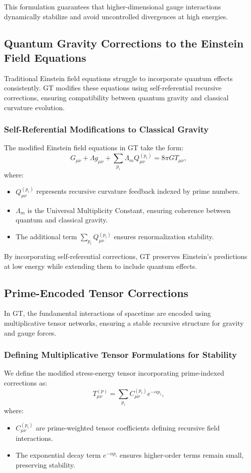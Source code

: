 \documentclass{article}
\theoremstyle{plain}
\begin{document}
This formulation guarantees that higher-dimensional gauge interactions dynamically stabilize and avoid uncontrolled divergences at high energies.

\subsection{Quantum Gravity Corrections to the Einstein Field Equations}
Traditional Einstein field equations struggle to incorporate quantum effects consistently. GT modifies these equations using self-referential recursive corrections, ensuring compatibility between quantum gravity and classical curvature evolution.

\subsubsection{Self-Referential Modifications to Classical Gravity}
The modified Einstein field equations in GT take the form:
\begin{equation}
G_{\mu\nu} + \Lambda g_{\mu\nu} + \sum_{p_i} \Lambda_m Q_{\mu\nu}^{(p_i)} = 8\pi G T_{\mu\nu},
\end{equation}
where:
\begin{itemize}
\item $Q_{\mu\nu}^{(p_i)}$ represents recursive curvature feedback indexed by prime numbers.
\item $\Lambda_m$ is the Universal Multiplicity Constant, ensuring coherence between quantum and classical gravity.
\item The additional term $\sum_{p_i} Q_{\mu\nu}^{(p_i)}$ ensures renormalization stability.
\end{itemize}

By incorporating self-referential corrections, GT preserves Einstein’s predictions at low energy while extending them to include quantum effects.

\subsection{Prime-Encoded Tensor Corrections}
In GT, the fundamental interactions of spacetime are encoded using multiplicative tensor networks, ensuring a stable recursive structure for gravity and gauge forces.

\subsubsection{Defining Multiplicative Tensor Formulations for Stability}
We define the modified stress-energy tensor incorporating prime-indexed corrections as:
\begin{equation}
T_{\mu\nu}^{(p)} = \sum_{p_i} C_{\mu\nu}^{(p_i)} e^{-\alpha p_i},
\end{equation}
where:
\begin{itemize}
\item $C_{\mu\nu}^{(p_i)}$ are prime-weighted tensor coefficients defining recursive field interactions.
\item The exponential decay term $e^{-\alpha p_i}$ ensures higher-order terms remain small, preserving stability.
\end{itemize}
\end{document}
